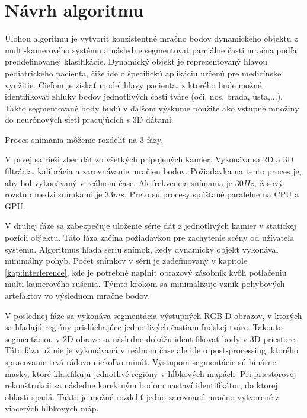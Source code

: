 \section{Návrh algoritmu}

Úlohou algoritmu je vytvoriť konzistentné mračno bodov dynamického objektu z multi-kamerového systému a následne segmentovať parciálne časti mračna podľa preddefinovanej klasifikácie. Dynamický objekt je reprezentovaný hlavou pediatrického pacienta, čiže ide o špecifickú aplikáciu určenú pre medicínske využitie. Cieľom je získať model hlavy pacienta, z ktorého bude možné identifikovať zhluky bodov jednotlivých časti tváre (oči, nos, brada, ústa,...). Takto segmentované body budú v ďalšom výskume použité ako vstupné množiny do neurónových sieti pracujúcich s 3D dátami. \newline

Proces snímania môžeme rozdeliť na 3 fázy. 

\begin{description}[leftmargin=*,labelsep=5.8mm, font=$\bullet$~\normalfont\scshape\color{black!20!black}]
	\item[Príprava dát v reálnom čase]
	\item[Identifikácia polohy hlavy] 
	\item[Segmentácia bodov podľa klasifikácie]
\end{description}


V prvej sa rieši zber dát zo všetkých pripojených kamier. Vykonáva sa 2D a 3D filtrácia, kalibrácia a zarovnávanie mračien bodov. Požiadavka na tento proces je, aby bol vykonávaný v reálnom čase. Ak frekvencia snímania je $30Hz$, časový rozstup medzi snímkami je $33ms$. Preto sú procesy spúšťané paralelne na CPU a GPU. \newline

V druhej fáze sa zabezpečuje uloženie série dát z jednotlivých kamier v statickej pozícii objektu. Táto fáza začína požiadavkou pre zachytenie scény od užívateľa systému. Algoritmus hľadá sériu snímok, kedy dynamický objekt vykonával minimálny pohyb. Počet snímkov v sérii je zadefinovaný v kapitole \ref{kap:interference}, kde je potrebné naplniť obrazový zásobník kvôli potlačeniu multi-kamerového rušenia. Týmto krokom sa minimalizuje vznik pohybových artefaktov vo výslednom mračne bodov. \newline

V poslednej fáze sa vykonáva segmentácia výstupných RGB-D obrazov, v ktorých sa hľadajú regióny prislúchajúce jednotlivých častiam ľudskej tváre. Takouto segmentáciou v 2D  obraze sa následne dokážu identifikovať body v 3D priestore. Táto fáza už nie je vykonávaná v reálnom čase ale ide o post-processing, ktorého spracovanie trvá rádovo niekoľko minút. Výstupom segmentácie sú binárne masky, ktoré klasifikujú jednotlivé regióny v hĺbkových mapách. Pri priestorovej rekonštrukcii sa následne korektným bodom nastaví identifikátor, do ktorej oblasti spadá. Takto je možné rozdeliť jedno zarovnané mračno vytvorené z viacerých hĺbkových máp.

